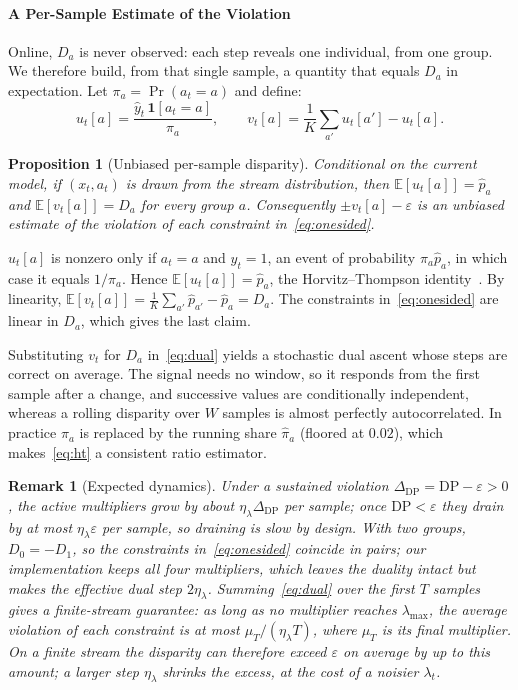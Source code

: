 \documentclass[conference]{IEEEtran}
\newtheorem{proposition}{Proposition}
\newtheorem{remark}{Remark}
\newcommand{\rev}[1]{{\color{blue}#1}}
\renewcommand{\rev}[1]{#1}
\begin{document}
\paragraph*{A Per-Sample Estimate of the Violation}
Online, $D_a$ is never observed: each step reveals one individual, from one group. We therefore build, from that single sample, a quantity that equals $D_a$ in
expectation. Let $\pi_a=\Pr(a_t=a)$ and define:
\begin{equation}
u_t[a]=\frac{\hat y_t\,\mathbf{1}[a_t=a]}{\pi_a},\qquad v_t[a]=\frac1K\sum_{a'}u_t[a']-u_t[a].
\label{eq:ht}
\end{equation}

\begin{proposition}[Unbiased per-sample disparity]
\label{prop:ht}
Conditional on the current model, if $(x_t,a_t)$ is drawn from the stream distribution, then $\mathbb{E}[u_t[a]]=\hat p_a$ and $\mathbb{E}[v_t[a]]=D_a$ for every
group $a$. Consequently $\pm v_t[a]-\varepsilon$ is an unbiased estimate of the violation of each constraint in~\eqref{eq:onesided}.
\end{proposition}
\begin{IEEEproof}
$u_t[a]$ is nonzero only if $a_t=a$ and $\hat y_t=1$, an event of probability $\pi_a\hat p_a$, in which case it equals $1/\pi_a$. Hence
$\mathbb{E}[u_t[a]]=\hat p_a$, the Horvitz--Thompson identity~\cite{bbbe4e97-7833-3faa-820c-4c61f82fe965}. By linearity,
$\mathbb{E}[v_t[a]]=\frac1K\sum_{a'}\hat p_{a'}-\hat p_a=D_a$. The constraints in~\eqref{eq:onesided} are linear in $D_a$, which gives the last claim.
\end{IEEEproof}

Substituting $v_t$ for $D_a$ in~\eqref{eq:dual} yields a stochastic dual ascent whose steps are correct on average. The signal needs no window, so it responds from
the first sample after a change, and successive values are conditionally independent, whereas a rolling disparity over $W$ samples is almost perfectly
autocorrelated. In practice $\pi_a$ is replaced by the running share $\hat\pi_a$ (floored at $0.02$), which makes~\eqref{eq:ht} a consistent ratio estimator.

\begin{remark}[Expected dynamics]
\label{rem:dyn}
Under a sustained violation $\Delta_{\mathrm{DP}}=\mathrm{DP}-\varepsilon>0$, the active multipliers grow by about $\eta_\lambda\Delta_{\mathrm{DP}}$ per sample;
once $\mathrm{DP}<\varepsilon$ they drain by at most $\eta_\lambda\varepsilon$ per sample, so draining is slow by design. With two groups, $D_0=-D_1$, so the
constraints in~\eqref{eq:onesided} coincide in pairs; our implementation keeps all four multipliers, which leaves the duality intact but makes the effective dual
step $2\eta_\lambda$. \rev{Summing~\eqref{eq:dual} over the first $T$ samples gives a finite-stream guarantee: as long as no multiplier reaches
$\lambda_{\max}$, the average violation of each constraint is at most $\mu_T/(\eta_\lambda T)$, where $\mu_T$ is its final multiplier. On a finite
stream the disparity can therefore exceed $\varepsilon$ on average by up to this amount; a larger step $\eta_\lambda$ shrinks the excess, at the cost of a
noisier $\lambda_t$.}
\end{remark}
\end{document}
